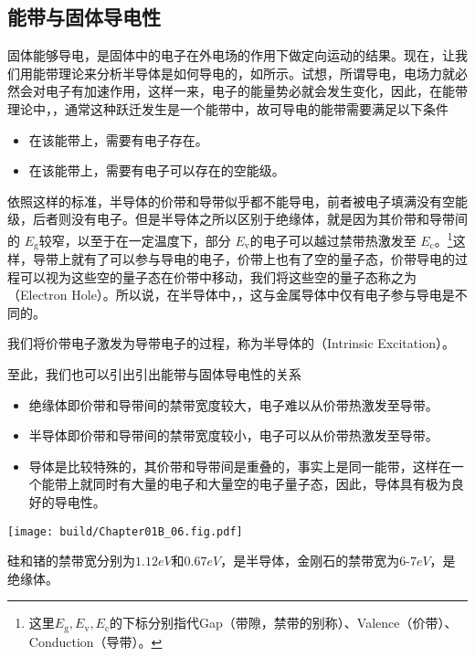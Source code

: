 \subsection{能带与固体导电性}
固体能够导电，是固体中的电子在外电场的作用下做定向运动的结果。现在，让我们用能带理论来分析半导体是如何导电的，如所示。试想，所谓导电，电场力就必然会对电子有加速作用，这样一来，电子的能量势必就会发生变化，因此，在能带理论中，，通常这种跃迁发生是一个能带中，故可导电的能带需要满足以下条件
\begin{itemize}
    \item 在该能带上，需要有电子存在。
    \item 在该能带上，需要有电子可以存在的空能级。
\end{itemize}
依照这样的标准，半导体的价带和导带似乎都不能导电，前者被电子填满没有空能级，后者则没有电子。但是半导体之所以区别于绝缘体，就是因为其价带和导带间的 $E_\text{g}$较窄，以至于在一定温度下，部分 $E_\text{v}$的电子可以越过禁带热激发至 $E_\text{c}$。\footnote{这里$E_\text{g},E_\text{v},E_\text{c}$的下标分别指代Gap（带隙，禁带的别称）、Valence（价带）、Conduction（导带）。}这样，导带上就有了可以参与导电的电子，价带上也有了空的量子态，价带导电的过程可以视为这些空的量子态在价带中移动，我们将这些空的量子态称之为（Electron Hole）。所以说，在半导体中，，这与金属导体中仅有电子参与导电是不同的。

我们将价带电子激发为导带电子的过程，称为半导体的（Intrinsic Excitation）。

\goodbreak

至此，我们也可以引出引出能带与固体导电性的关系
\begin{itemize}
    \item 绝缘体即价带和导带间的禁带宽度较大，电子难以从价带热激发至导带。
    \item 半导体即价带和导带间的禁带宽度较小，电子可以从价带热激发至导带。
    \item 导体是比较特殊的，其价带和导带间是重叠的，事实上是同一能带，这样在一个能带上就同时有大量的电子和大量空的电子量子态，因此，导体具有极为良好的导电性。
\end{itemize}

\begin{Figure}[半导体的能带]
    \texttt{[image: build/Chapter01B\_06.fig.pdf]}
\end{Figure}
硅和锗的禁带宽分别为$1.12\si{eV}$和$0.67\si{eV}$，是半导体，金刚石的禁带宽为$6$-$7\si{eV}$，是绝缘体。